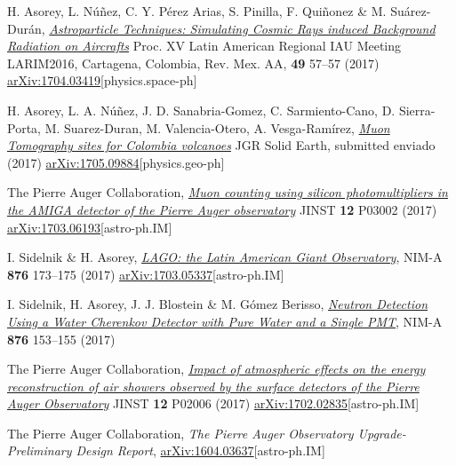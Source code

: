 \begin{etaremune}
\item {}H. Asorey, L. Núñez, C. Y. Pérez Arias, S. Pinilla, F. Quiñonez \& M. Suárez-Durán, \href{http://www.astroscu.unam.mx/rmaa/RMxAC..49/PDF/RMxAC..49\_oral7.pdf}{\emph{Astroparticle Techniques: Simulating Cosmic Rays induced Background Radiation on Aircrafts}} \en Proc. XV Latin American Regional IAU Meeting LARIM2016, Cartagena, Colombia, Rev. Mex. AA, {\bf{49}} 57--57 (2017) \href{http://arxiv.org/abs/1704.03419}{arXiv:1704.03419}[physics.space-ph]

\item {}H. Asorey, L. A. Núñez, J. D. Sanabria-Gomez, C. Sarmiento-Cano, D. Sierra-Porta, M. Suarez-Duran, M. Valencia-Otero, A. Vesga-Ramírez, \href{}{\emph{Muon Tomography sites for Colombia volcanoes}} JGR Solid Earth, \ifeng submitted \else enviado \fi (2017) \href{http://arxiv.org/abs/1705.09884}{arXiv:1705.09884}[physics.geo-ph]
	
\item {}The Pierre Auger Collaboration, \href{https://doi.org/10.1088/1748-0221/12/03/P03002}{\emph{Muon counting using silicon photomultipliers in the AMIGA detector of the Pierre Auger observatory}} JINST {\bf 12} P03002 (2017) \href{http://arxiv.org/abs/1703.06193}{arXiv:1703.06193}[astro-ph.IM]

\item {}I. Sidelnik \& H. Asorey, \href{https://doi.org/10.1016/j.nima.2017.02.069}{\emph{LAGO: the Latin American Giant Observatory}}, NIM-A {\bf{876}} 173--175 (2017) \href{http://arxiv.org/abs/1703.05337}{arXiv:1703.05337}[astro-ph.IM]

\item {} I. Sidelnik, H. Asorey, J. J. Blostein \& M. Gómez Berisso, \href{https://doi.org/10.1016/j.nima.2017.02.048}{\emph{Neutron Detection Using a Water Cherenkov Detector with Pure Water and a Single PMT}}, NIM-A {\bf{876}} 153--155 (2017)

\item {}The Pierre Auger Collaboration, \href{https://doi.org/10.1088/1748-0221/12/02/P02006}{\emph{Impact of atmospheric effects on the energy reconstruction of air showers observed by the surface detectors of the Pierre Auger Observatory}} JINST {\bf 12} P02006 (2017) \href{http://arxiv.org/abs/1702.02835}{arXiv:1702.02835}[astro-ph.IM]

\item {} The Pierre Auger Collaboration, {\emph{The Pierre Auger Observatory Upgrade-Preliminary Design Report}}, \href{http://arxiv.org/abs/1604.03637}{arXiv:1604.03637}[astro-ph.IM]
	

\end{etaremune}
